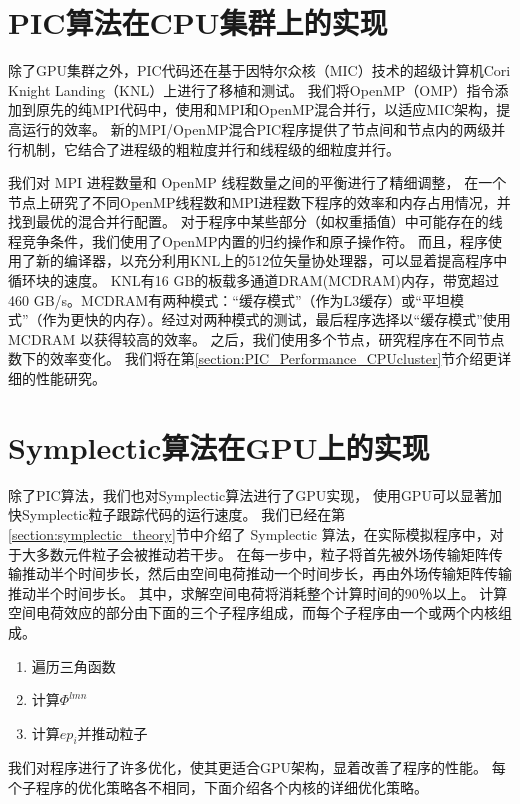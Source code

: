 \section{PIC算法在CPU集群上的实现}        \label{section:PIC_Code_CPUcluster}
除了GPU集群之外，PIC代码还在基于因特尔众核（MIC）技术的超级计算机Cori Knight Landing（KNL）上进行了移植和测试。
我们将OpenMP（OMP）指令添加到原先的纯MPI代码中，使用和MPI和OpenMP混合并行，以适应MIC架构，提高运行的效率。
新的MPI/OpenMP混合PIC程序提供了节点间和节点内的两级并行机制，它结合了进程级的粗粒度并行和线程级的细粒度并行。

我们对 MPI 进程数量和 OpenMP 线程数量之间的平衡进行了精细调整，
在一个节点上研究了不同OpenMP线程数和MPI进程数下程序的效率和内存占用情况，并找到最优的混合并行配置。
对于程序中某些部分（如权重插值）中可能存在的线程竞争条件，我们使用了OpenMP内置的归约操作和原子操作符。
而且，程序使用了新的编译器，以充分利用KNL上的512位矢量协处理器，可以显着提高程序中循环块的速度。
KNL有16 GB的板载多通道DRAM(MCDRAM)内存，带宽超过460 GB/s。MCDRAM有两种模式：“缓存模式”（作为L3缓存）或“平坦模式”（作为更快的内存）。经过对两种模式的测试，最后程序选择以“缓存模式”使用 MCDRAM 以获得较高的效率。
之后，我们使用多个节点，研究程序在不同节点数下的效率变化。
我们将在第\ref{section:PIC_Performance_CPUcluster}节介绍更详细的性能研究。

\section{Symplectic算法在GPU上的实现}     \label{section:symplectic_GPU}
除了PIC算法，我们也对Symplectic算法进行了GPU实现，
使用GPU可以显著加快Symplectic粒子跟踪代码的运行速度。
我们已经在第\ref{section:symplectic_theory}节中介绍了 Symplectic 算法，在实际模拟程序中，对于大多数元件粒子会被推动若干步。
在每一步中，粒子将首先被外场传输矩阵传输推动半个时间步长，然后由空间电荷推动一个时间步长，再由外场传输矩阵传输推动半个时间步长。
其中，求解空间电荷将消耗整个计算时间的90％以上。 计算空间电荷效应的部分由下面的三个子程序组成，而每个子程序由一个或两个内核组成。
\begin{enumerate}
  \item 遍历三角函数
  \item 计算$\Phi^{lmn}$
  \item 计算$ep_i$并推动粒子
\end{enumerate}

我们对程序进行了许多优化，使其更适合GPU架构，显着改善了程序的性能。 每个子程序的优化策略各不相同，下面介绍各个内核的详细优化策略。
